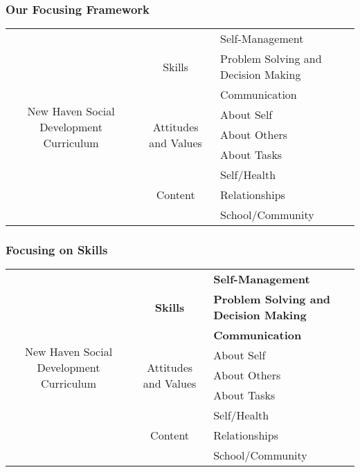 \documentclass[aspectratio=169]{beamer}
\newcommand{\tBold}[1]{\textcolor{FSUred}{\textbf{#1}}}
\begin{document}
	\begin{frame}
		\frametitle{\textsf{Our Focusing Framework}}
		\footnotesize\begin{tabular}{ccl}
			\toprule
			\multirow{9}{*}{\parbox[l]{5cm}{\raggedright\huge New Haven Social Development Curriculum \footnotesize}} & \multirow{3}{*}{\normalsize Skills \footnotesize} & Self-Management \\
			 & & Problem Solving and Decision Making \\
			 & & Communication \\
			\cline{2-3}
			 & \multirow{3}{*}{\normalsize Attitudes and Values \footnotesize} & About Self \\
			 & & About Others \\
			 & & About Tasks \\
			 \cline{2-3}
			 & \multirow{3}{*}{\normalsize Content \footnotesize} & Self/Health \\
			 & & Relationships \\
			 & & School/Community \\
			 \bottomrule
		\end{tabular}
	\end{frame}

	\begin{frame}
		\frametitle{\textsf{Focusing on Skills}}
		\footnotesize\begin{tabular}{ccl}
			\toprule
			\multirow{9}{*}{\parbox[l]{5cm}{\raggedright\huge New Haven Social Development Curriculum \footnotesize}} & \multirow{3}{*}{\normalsize \tBold{Skills} \footnotesize} & \tBold{Self-Management} \\
			 & & \tBold{Problem Solving and Decision Making} \\
			 & & \tBold{Communication} \\
			\cline{2-3}
			 & \multirow{3}{*}{\normalsize Attitudes and Values \footnotesize} & About Self \\
			 & & About Others \\
			 & & About Tasks \\
			 \cline{2-3}
			 & \multirow{3}{*}{\normalsize Content \footnotesize} & Self/Health \\
			 & & Relationships \\
			 & & School/Community \\
			 \bottomrule
		\end{tabular}
	\end{frame}
\end{document}
